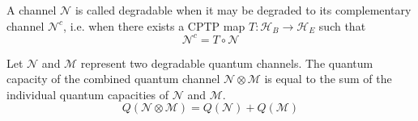 \begin{definition}
A channel $\mathcal{N}$ is called degradable when it may be degraded to its complementary channel $\mathcal{N}^c$, i.e. when there exists a CPTP map $T: \mathcal{H}_B \rightarrow \mathcal{H}_E$ such that
$$\mathcal{N}^c = T \circ \mathcal{N}$$
\end{definition}

\begin{theorem}
Let $\mathcal{N}$ and $\mathcal{M}$ represent two degradable quantum channels. The quantum capacity of the combined quantum channel $\mathcal{N} \otimes \mathcal{M}$ is equal to the sum of the individual quantum capacities of $\mathcal{N}$ and $\mathcal{M}$.
$$Q(\mathcal{N} \otimes \mathcal{M}) = Q(\mathcal{N}) + Q(\mathcal{M})$$
\end{theorem}

